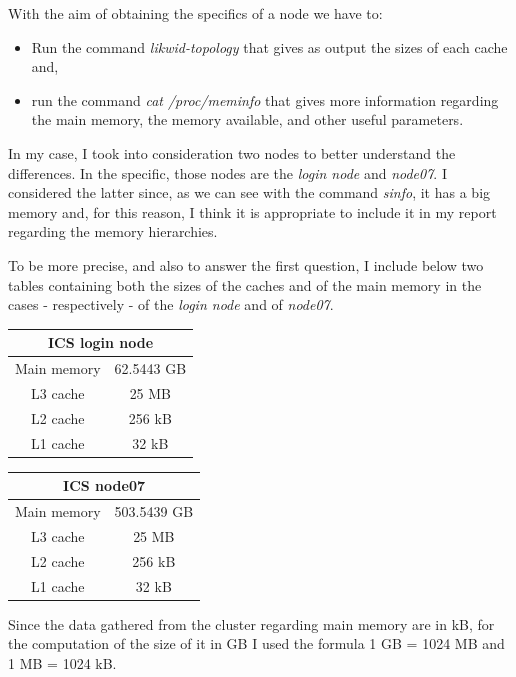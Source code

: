 \documentclass[unicode,11pt,a4paper,oneside,numbers=endperiod,openany]{scrartcl}
\begin{document}
With the aim of obtaining the specifics of a node we have to:
\begin{itemize}
	\item Run the command \textit{likwid-topology} that gives as output the sizes of each cache and,
	\item run the command \textit{cat /proc/meminfo} that gives more information regarding the main memory, the memory available, and other useful parameters.
\end{itemize}
In my case, I took into consideration two nodes to better understand the differences. In the specific, those nodes are the \textit{login node} and \textit{node07}. I considered the latter since, as we can see with the command \textit{sinfo}, it has a big memory and, for this reason, I think it is appropriate to include it in my report regarding the memory hierarchies.

To be more precise, and also to answer the first question, I include below two tables containing both the sizes of the caches and of the main memory in the cases - respectively - of the \textit{login node} and of \textit{node07}.

\vspace{0.5cm}
\parbox{.45\linewidth}{
\centering
\begin{tabular}{|c|c|}
	\hline
	\multicolumn{2}{|c|}{ICS login node} \\
	\hline
	Main memory & 62.5443 GB \\
	\hline
	L3 cache &25 MB \\
	\hline
	L2 cache &256 kB \\
	\hline
	L1 cache &32 kB \\
	\hline
\end{tabular}
}
\hfill
\parbox{.45\linewidth}{
\centering
\begin{tabular}{|c|c|}
	\hline
	\multicolumn{2}{|c|}{ICS node07} \\
	\hline
	Main memory & 503.5439 GB \\
	\hline
	L3 cache &25 MB \\
	\hline
	L2 cache &256 kB \\
	\hline
	L1 cache &32 kB \\
	\hline
\end{tabular}
}
\vspace{0.5cm}

Since the data gathered from the cluster regarding main memory are in kB, for the computation of the size of it in GB I used the formula 1 GB = 1024 MB and 1 MB = 1024 kB. 
\end{document}
